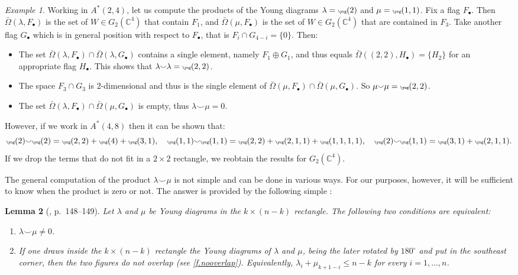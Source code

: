 \documentclass[10pt, a4paper]{amsart}
\theoremstyle{plain}
\newtheorem{lemma}{Lemma}[section]
\theoremstyle{definition}
\theoremstyle{remark}
\theoremstyle{note}
\newtheorem{example}[lemma]{Example}
\numberwithin{equation}{section}
\begin{document}
\begin{example}
Working in $A^*(2,4)$,
let us compute the products of the Young diagrams 
$\lambda = {\tiny \yng(2)}$ and $\mu={\tiny \yng(1,1)}$.
Fix a flag $F_\bullet$.
Then
$\bar\Omega(\lambda, F_\bullet)$ is the set of $W \in G_2({\mathbb{C}}^4)$ that contain $F_1$,
and $\bar\Omega(\mu, F_\bullet)$ is the set of $W \in G_2({\mathbb{C}}^4)$ that are contained in $F_3$.
Take another flag $G_\bullet$ which is in general position with respect to $F_\bullet$,
that is $F_i \cap G_{4-i} = \{0\}$.
Then:
\begin{itemize}
\item The set
$\bar\Omega(\lambda, F_\bullet) \cap \bar\Omega(\lambda, G_\bullet)$ 
contains a single element, namely $F_1 \oplus G_1$,
and thus equals $\bar\Omega((2,2),H_\bullet) = \{H_2\}$ for an appropriate flag $H_\bullet$.
This shows that
$\lambda {\smallsmile} \lambda = {\tiny \yng(2,2)}$.

\item The space $F_3 \cap G_3$ is $2$-dimensional and thus
is the single element of 
$\bar\Omega(\mu, F_\bullet) \cap \bar\Omega(\mu, G_\bullet)$.
So
$\mu {\smallsmile} \mu = {\tiny \yng(2,2)}$.

\item The set 
$\bar\Omega(\lambda, F_\bullet) \cap \bar\Omega(\mu, G_\bullet)$
is empty, thus $\lambda {\smallsmile} \mu = 0$.
\end{itemize}
However, if we work in $A^*(4,8)$  
then it can be shown that:
$$
{\tiny \yng(2)}   {\smallsmile} {\tiny \yng(2)}   = {\tiny \yng(2,2)} + {\tiny \yng(4)} + {\tiny \yng(3,1)}, \quad
{\tiny \yng(1,1)} {\smallsmile} {\tiny \yng(1,1)} = {\tiny \yng(2,2)} + {\tiny \yng(2,1,1)} + {\tiny \yng(1,1,1,1)}, \quad
{\tiny \yng(2)}   {\smallsmile} {\tiny \yng(1,1)} = {\tiny \yng(3,1)} + {\tiny \yng(2,1,1)}.
$$
If we drop the terms that do not fit in a $2 \times 2$ rectangle, we reobtain the results for $G_2({\mathbb{C}}^4)$. 
\end{example}

The general computation of the product $\lambda {\smallsmile} \mu$ is 
not simple and can be done in various ways. 
For our purposes, however, it will be sufficient to know when 
the product is zero or not.
The answer is provided by the following simple : 

\begin{lemma}[\cite{Fulton}, p.~148--149]\label{l.overlap}
Let $\lambda$ and $\mu$ be Young diagrams in the $k \times (n-k)$ rectangle.
The following two conditions are equivalent:
\begin{enumerate}

\item\label{i.nonzero} 
$\lambda {\smallsmile} \mu \neq 0$.

\item\label{i.nonoverlap} 
If one draws inside the $k \times (n-k)$ rectangle
the Young diagrams of $\lambda$ and $\mu$,
being the later rotated by $180^{\circ}$ and put in the southeast corner,
then the two figures do not overlap
(see \cref{f.nooverlap}). 
Equivalently, $\lambda_i + \mu_{k+1-i} \le n-k$ for every $i=1, \ldots, n$.
\end{enumerate}
\end{lemma}
\end{document}
